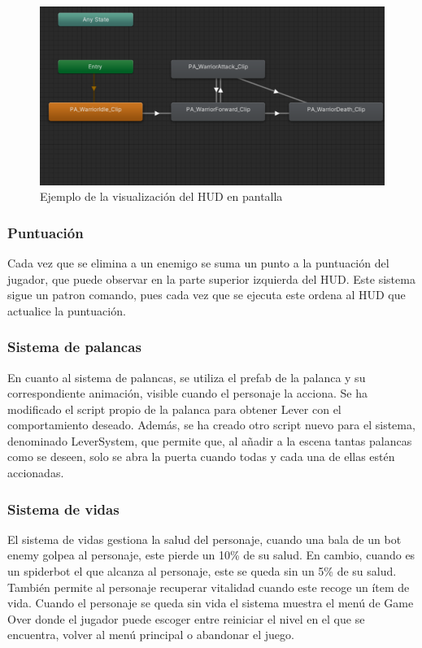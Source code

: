\begin{figure}[H]
	\centering
	\includegraphics[scale=0.65]{imagenes/MaquinaEstados.png}
	\caption{\label{fig:MaquinaEstados}Ejemplo de la visualización del HUD en pantalla}
\end{figure}

\subsubsection{Puntuación}
Cada vez que se elimina a un enemigo se suma un punto a la puntuación del jugador, que puede observar en la parte superior izquierda del HUD. Este sistema sigue un patron comando, pues cada vez que se ejecuta este ordena al HUD que actualice la puntuación.

\subsubsection{Sistema de palancas}
En cuanto al sistema de palancas, se utiliza el prefab de la palanca y su correspondiente animación, visible cuando el personaje la acciona. Se ha modificado el script propio de la palanca para obtener Lever con el comportamiento deseado. Además, se ha creado otro script nuevo para el sistema, denominado LeverSystem, que permite que, al añadir a la escena tantas palancas como se deseen, solo se abra la puerta cuando todas y cada una de ellas estén accionadas.

\subsubsection{Sistema de vidas}
El sistema de vidas gestiona la salud del personaje, cuando una bala de un bot enemy golpea al personaje, este pierde un 10\% de su salud. En cambio, cuando es un spiderbot el que alcanza al personaje, este se queda sin un 5\% de su salud. También permite al personaje recuperar vitalidad cuando este recoge un ítem de vida. Cuando el personaje se queda sin vida el sistema muestra el menú de Game Over donde el jugador puede escoger entre reiniciar el nivel en el que se encuentra, volver al menú principal o abandonar el juego.

